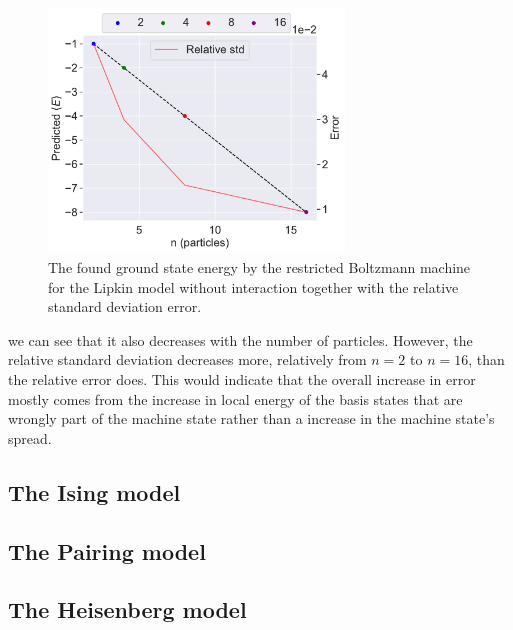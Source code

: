 \begin{figure}[H]
  \begin{center}
    \includegraphics[width=0.7\textwidth]{Figures/Plots/Implementation Test/Lipkin_relative_std.pdf}
  \end{center}
  \caption{The found ground state energy by the restricted Boltzmann machine for the Lipkin model without interaction together with the relative standard deviation error.}
  \label{fig:Lipkin_relative_std}
\end{figure}

we can see that it also decreases with the number of particles. However, the relative standard deviation decreases more, relatively from $n=2$ to $n=16$, than the relative error does. This would indicate that the overall increase in error mostly comes from the increase in local energy of the basis states that are wrongly part of the machine state rather than a increase in the machine state's spread.
\subsection{The Ising model}

\subsection{The Pairing model}

\subsection{The Heisenberg model}

